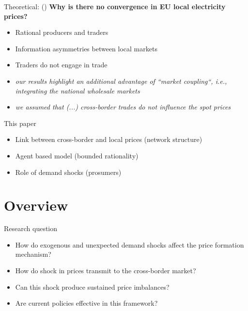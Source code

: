 \documentclass{beamer}
\begin{document}
\begin{frame}{Theoretical: \citeauthor{Gebhardt2013} (\citeyear{Gebhardt2013})}
    \textbf{Why is there no convergence in EU local electricity prices?}

    \begin{itemize} \setlength\itemsep{1.5em}
              \pause \item Rational producers and traders
              \pause \item Information asymmetries between local markets
              \pause \item Traders do not engage in trade
              \pause \item \textit{our results highlight an additional advantage of ``market coupling``, i.e., integrating the national wholesale markets}
              \pause \item \textit{we assumed that (...) cross-border trades do not influence the spot prices}
    \end{itemize}
\end{frame}

\begin{frame}{This paper}
    \begin{itemize} \setlength\itemsep{1.5em}
        \item Link between cross-border and local prices (network structure)
        \item Agent based model (bounded rationality)
        \item Role of demand shocks (prosumers)
    \end{itemize}
\end{frame}

\section{Overview}

\begin{frame}{Research question}

    \begin{itemize} \setlength{\itemsep}{1em}
        \item How do exogenous and unexpected demand shocks affect the price formation mechanism? \pause
        \item How do shock in prices transmit to the cross-border market? \pause
        \item Can this shock produce sustained price imbalances? \pause
        \item Are current policies effective in this framework?
    \end{itemize}

\end{frame}
\end{document}
